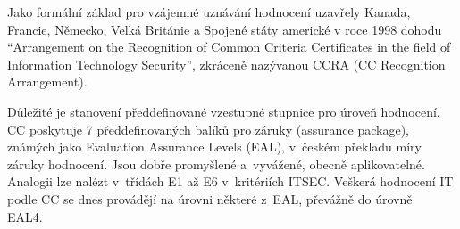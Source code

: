\documentclass[a4paper,12pt]{article}
\begin{document}
Jako formální základ pro vzájemné uznávání hodnocení uzavřely Kanada, Francie, Německo, Velká Británie a Spojené státy americké v roce 1998 dohodu “Arrangement on the Recognition of
Common Criteria Certificates in the field of Information Technology Security”, zkráceně nazývanou CCRA (CC Recognition Arrangement).~\cite{NBUHodnoceniBezpecnostiSW}

Důležité je stanovení předdefinované vzestupné stupnice pro úroveň hodnocení. CC poskytuje 7 předdefinovaných balíků pro záruky (assurance package), známých jako Evaluation Assurance Levels (EAL), v~českém překladu míry záruky hodnocení. Jsou dobře promyšlené a~vyvážené, obecně aplikovatelné. Analogii lze nalézt v~třídách E1 až E6 v~kritériích ITSEC. Veškerá hodnocení IT podle CC se dnes provádějí na úrovni některé z~EAL, převážně do úrovně EAL4.~\cite{NBUHodnoceniBezpecnostiSW}
\end{document}
